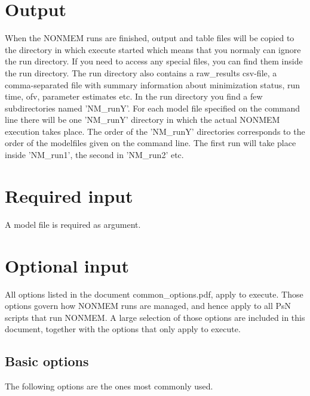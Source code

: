 \section{Output}
When the NONMEM runs are finished, output and table files will be copied to the directory in which execute started which means 
that you normaly can ignore the run directory. If you need to access any special files, you can find them inside the run directory. 
The run directory also contains a raw\_results csv-file, a comma-separated file with summary information about minimization status, 
run time, ofv, parameter estimates etc. In the run directory you find a few subdirectories named 'NM\_runY'. For each model file 
specified on the command line there will be one 'NM\_runY' directory in which the actual NONMEM execution takes place. 
The order of the 'NM\_runY' directories corresponds to the order of the modelfiles given on the command line. The first run will take 
place inside 'NM\_run1', the second in 'NM\_run2' etc.

\section{Required input}
A model file is required as argument.
	
\section{Optional input}
All options listed in the document common\_options.pdf, apply to execute. Those options govern how NONMEM runs are managed, 
and hence apply to all PsN scripts that run NONMEM. A large selection of those options are included in this document,
together with the options that only apply to execute. 
		
\renewcommand{\guidetoolname}{modelfit}
		
\subsection{Basic options}
The following options are the ones most commonly used. 


\renewcommand{\guidetoolname}{execute}
			
